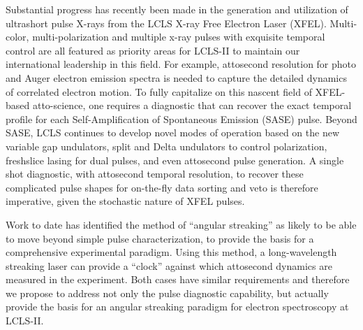 Substantial progress has recently been made in the generation and utilization of ultrashort pulse X-rays from the LCLS X-ray Free Electron Laser (XFEL). 
Multi-color, multi-polarization and multiple x-ray pulses with exquisite temporal control are all featured as priority areas for LCLS-II to maintain our international leadership in this field. 
For example, attosecond resolution for photo and Auger electron emission spectra is needed to capture the detailed dynamics of correlated electron motion. 
To fully capitalize on this nascent field of XFEL-based atto-science, one requires a diagnostic that can recover the exact temporal profile for each Self-Amplification of Spontaneous Emission (SASE) pulse. 
Beyond SASE, LCLS continues to develop novel modes of operation based on the new variable gap undulators, split and Delta undulators to control polarization, freshslice lasing for dual pulses, and even attosecond pulse generation. A single shot diagnostic, with attosecond temporal resolution, to recover these complicated pulse shapes for on-the-fly data sorting and veto is therefore imperative, given the stochastic nature of XFEL pulses.

Work to date has identified the method of ``angular streaking'' as likely to be able to move beyond simple pulse characterization, to provide the basis for a comprehensive experimental paradigm. 
Using this method, a long-wavelength streaking laser can provide a ``clock'' against which attosecond dynamics are measured in the experiment. 
Both cases have similar requirements and therefore we propose to address not only the pulse diagnostic capability, but actually provide the basis for an angular streaking paradigm for electron spectroscopy at LCLS-II.


